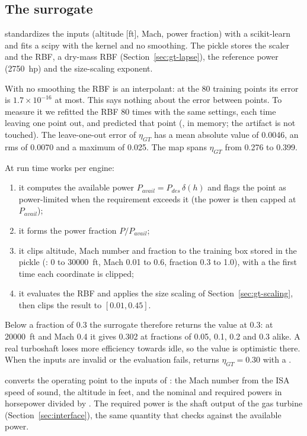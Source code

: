 \documentclass[a4paper,11pt]{article}
\newcommand{\etagt}{\eta_{GT}}
\begin{document}
\subsection{The surrogate}\label{sec:gt-surrogate}
 standardizes the inputs (altitude [ft], Mach, power
fraction) with a scikit-learn  and fits a scipy  with the
 kernel and no smoothing. The pickle stores the scaler and the RBF, a dry-mass
RBF (Section~\ref{sec:gt-lapse}), the reference power (\SI{2750}{hp}) and the size-scaling
exponent.

With no smoothing the RBF is an interpolant: at the 80 training points its error is
$1.7\times10^{-16}$ at most. This says nothing about the error between points. To measure it we
refitted the RBF 80 times with the same settings, each time leaving one point out, and
predicted that point (, in memory; the artifact is not touched). The
leave-one-out error of $\etagt$ has a mean absolute value of 0.0046, an rms of 0.0070 and a
maximum of 0.025. The map spans $\etagt$ from 0.276 to 0.399.

At run time 
works per engine:
\begin{enumerate}
\item it computes the available power $P_{avail} = P_{des}\,\delta(h)$ and flags the point as
  power-limited when the requirement exceeds it (the power is then capped at $P_{avail}$);
\item it forms the power fraction $P/P_{avail}$;
\item it clips altitude, Mach number and fraction to the training box stored in the pickle
  (: 0 to \SI{30000}{ft}, Mach 0.01 to 0.6, fraction 0.3 to 1.0), with a
   the first time each coordinate is clipped;
\item it evaluates the RBF and applies the size scaling of Section~\ref{sec:gt-scaling}, then
  clips the result to $[0.01, 0.45]$.
\end{enumerate}
Below a fraction of 0.3 the surrogate therefore returns the value at 0.3: at \SI{20000}{ft} and
Mach 0.4 it gives 0.302 at fractions of 0.05, 0.1, 0.2 and 0.3 alike. A real turboshaft loses
more efficiency towards idle, so the value is optimistic there. When the inputs are invalid or
the evaluation fails,  returns $\etagt = 0.30$ with a .

 converts the operating point to the inputs of
: the Mach number from the ISA speed of sound, the altitude in feet, and the
nominal and required powers in horsepower divided by . The required power is
the shaft output of the gas turbine (Section~\ref{sec:interface}), the same quantity that
 checks against the available power.
\end{document}
